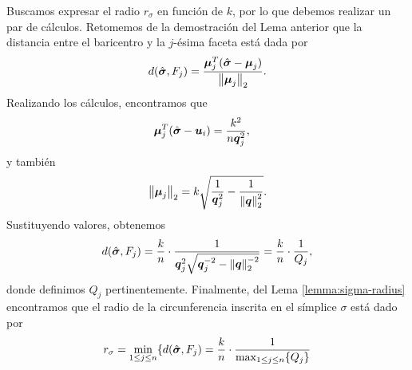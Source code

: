 Buscamos expresar el radio $r_\sigma$ en función de $k$, por lo que debemos realizar un par de
cálculos. Retomemos de la demostración del Lema anterior que la distancia entre el baricentro y la
$j$-ésima faceta está dada por
\begin{equation*}
	d(\hat{\boldsymbol{ \sigma }}, F_j) = \frac{{\boldsymbol{\mu}}_j^T(\hat{\boldsymbol{ \sigma }} - \boldsymbol{\mu}_j)}{\left\lVert \boldsymbol{\mu}_j \right\rVert_2}.
\end{equation*}
Realizando los cálculos, encontramos que
\begin{align*}
	\boldsymbol{\mu}_j^T(\hat{\boldsymbol{ \sigma }} - \boldsymbol{u}_i)
	&= \frac{k^2}{n\boldsymbol{q}_j^2},
\end{align*}
y también
\begin{equation*}
	\left\lVert \boldsymbol{\mu}_j \right\rVert_2 = k \sqrt{\frac{1}{\boldsymbol{q}_j^2} - \frac{1}{\left\lVert \boldsymbol{q} \right\rVert_2^2}}.
\end{equation*}
Sustituyendo valores, obtenemos
\begin{equation*}
	d(\hat{\boldsymbol{ \sigma }}, F_j) = \frac{k}{n} \cdot
	\frac{1}{\boldsymbol{q}_j^2\sqrt{\boldsymbol{q}_j^{-2} - \left\lVert \boldsymbol{q} \right\rVert_2^{-2}}}
	= \frac{k}{n} \cdot \frac{1}{Q_j},
\end{equation*}
donde definimos $Q_j$ pertinentemente. Finalmente, del Lema \ref{lemma:sigma-radius} encontramos que
el radio de la circunferencia inscrita en el símplice $\sigma$ está dado por
\begin{equation}
	\label{eq:sigma-radius}
	r_\sigma = \min_{1 \leq j \leq n} \lbrace d(\hat{\boldsymbol{ \sigma }}, F_j) = \frac{k}{n} \cdot
	\frac{1}{\max_{1 \leq j \leq n} \lbrace Q_j \rbrace}
\end{equation}

